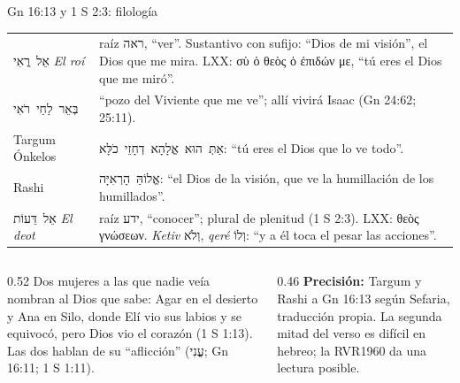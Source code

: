 \documentclass[hyperref={bookmarks=false},aspectratio=169]{beamer}
\newcommand{\heb}[1]{\mbox{\foreignlanguage{hebrew}{#1}}}
\newcommand{\grc}[1]{\foreignlanguage{ancientgreek}{#1}}
\newcommand{\precision}[1]{{\footnotesize\color{gris}\textbf{Precisión:} #1}}
\begin{document}
\begin{frame}{Gn 16:13 y 1 S 2:3: filología}
\scriptsize\renewcommand{\arraystretch}{1.12}
\begin{tabular}{@{}>{\RaggedRight\arraybackslash}p{3.0cm}>{\RaggedRight\arraybackslash}p{8.8cm}@{}}
\toprule
\heb{אֵל רֳאִי} \emph{El roí} & raíz \heb{ראה}, ``ver''. Sustantivo con sufijo: ``Dios de mi visión'', el Dios que me mira. LXX: \grc{σὺ ὁ θεὸς ὁ ἐπιδών με}, ``tú eres el Dios que me miró''. \\
\heb{בְּאֵר לַחַי רֹאִי} & ``pozo del Viviente que me ve''; allí vivirá Isaac (Gn 24:62; 25:11). \\
Targum Ónkelos & \heb{אַתְּ הוּא אֱלָהָא דְחָזֵי כֹלָּא}: ``tú eres el Dios que lo ve todo''. \\
Rashi & \heb{אֱלוֹהַּ הָרְאִיָּה}: ``el Dios de la visión, que ve la humillación de los humillados''. \\ \midrule
\heb{אֵל דֵּעוֹת} \emph{El deot} & raíz \heb{ידע}, ``conocer''; plural de plenitud (1 S 2:3). LXX: \grc{θεὸς γνώσεων}. \emph{Ketiv} \heb{וְלֹא}, \emph{qeré} \heb{וְלוֹ}: ``y a él toca el pesar las acciones''. \\
\bottomrule
\end{tabular}\par\medskip
\begin{columns}[t,onlytextwidth]
\begin{column}{0.52\textwidth}\scriptsize\RaggedRight
Dos mujeres a las que nadie veía nombran al Dios que sabe: Agar en el desierto y Ana en Silo, donde Elí vio sus labios y se equivocó, pero Dios vio el corazón (1 S 1:13). Las dos hablan de su ``aflicción'' (\heb{עֳנִי}; Gn 16:11; 1 S 1:11).
\end{column}
\begin{column}{0.46\textwidth}
\precision{Targum y Rashi a Gn 16:13 según Sefaria, traducción propia. La segunda mitad del verso es difícil en hebreo; la RVR1960 da una lectura posible.}
\end{column}
\end{columns}
\end{frame}
\end{document}
